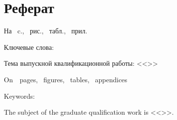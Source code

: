 \chapter*[Count-me]{Реферат} %
\thispagestyle{empty}%
%
%




На ~c.,  
~{рис.},
~{табл.},
~{прил.}%



{Ключевые слова: \keywordsRu} %

Тема выпускной квалификационной работы: <<\thesisTitle>>





\printTheAbstract %


On~~pages, 
~figures, 
~tables,
~appendices%

{Keywords: \keywordsEn} %
	
The subject of the graduate qualification work is <<\thesisTitleEn>>.
	
	
\abstractEn %

	


\thispagestyle{empty}
%
